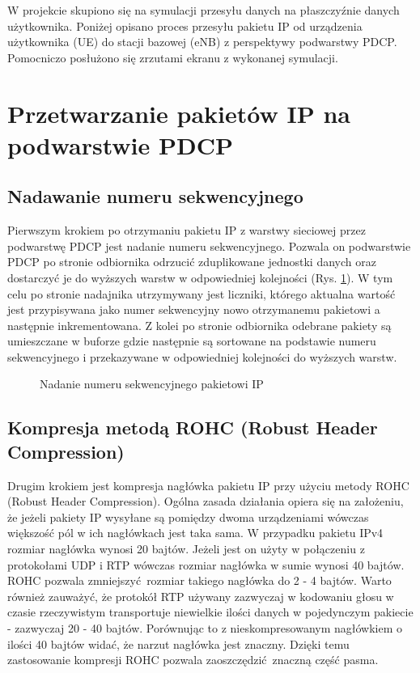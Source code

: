 W projekcie skupiono się na symulacji przesyłu danych na płaszczyźnie danych użytkownika. Poniżej opisano proces przesyłu pakietu IP od urządzenia użytkownika (UE) do stacji bazowej (eNB) z perspektywy podwarstwy PDCP. Pomocniczo posłużono się zrzutami ekranu z wykonanej symulacji.

\section{Przetwarzanie pakietów IP na podwarstwie PDCP}

\subsection{Nadawanie numeru sekwencyjnego}

Pierwszym krokiem po otrzymaniu pakietu IP z warstwy sieciowej przez podwarstwę PDCP jest nadanie numeru sekwencyjnego. Pozwala on podwarstwie PDCP po stronie odbiornika odrzucić zduplikowane jednostki danych oraz dostarczyć je do wyższych warstw w odpowiedniej kolejności (Rys. \ref{fig:pdcpseq}). 
W tym celu po stronie nadajnika utrzymywany jest liczniki, którego aktualna wartość jest przypisywana jako numer sekwencyjny nowo otrzymanemu pakietowi a następnie inkrementowana. Z kolei po stronie odbiornika odebrane pakiety są umieszczane w buforze gdzie następnie są sortowane na podstawie numeru sekwencyjnego i przekazywane w odpowiedniej kolejności do wyższych warstw.

\begin{figure}[ht]
	\centerline{}
	\caption{Nadanie numeru sekwencyjnego pakietowi IP}
	\label{fig:pdcpseq}
\end{figure}

\subsection{Kompresja metodą ROHC (Robust Header Compression)}

Drugim krokiem jest kompresja nagłówka pakietu IP przy użyciu metody ROHC (Robust Header Compression). Ogólna zasada działania opiera się na założeniu, że jeżeli pakiety IP wysyłane są pomiędzy dwoma urządzeniami wówczas większość pól w ich nagłówkach jest taka sama. W przypadku pakietu IPv4 rozmiar nagłówka wynosi 20 bajtów. Jeżeli jest on użyty w połączeniu z protokołami UDP i RTP wówczas rozmiar nagłówka w sumie wynosi 40 bajtów. ROHC pozwala zmniejszyć rozmiar takiego nagłówka do 2 - 4 bajtów. Warto również zauważyć, że protokół RTP używany zazwyczaj w kodowaniu głosu w czasie rzeczywistym transportuje niewielkie ilości danych w pojedynczym pakiecie - zazwyczaj 20 - 40 bajtów. Porównując to z nieskompresowanym nagłówkiem o ilości 40 bajtów widać, że narzut nagłówka jest znaczny. Dzięki temu zastosowanie kompresji ROHC pozwala zaoszczędzić znaczną część pasma.


